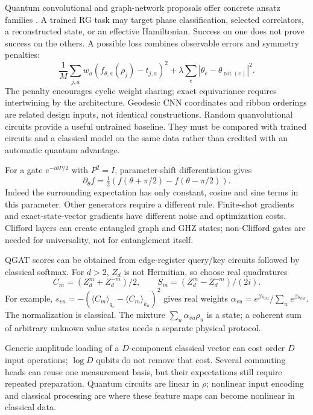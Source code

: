 \documentclass[11pt,oneside,openany]{book}
\theoremstyle{definition}\newtheorem{definition}[theorem]{Definition}
\theoremstyle{remark}\newtheorem{remark}[theorem]{Remark}
\begin{document}
Quantum convolutional and graph-network proposals offer concrete ansatz
families \cite{PhysCong,PhysZheng,PhysNing}. A trained RG task may target
phase classification, selected correlators, a reconstructed state, or an
effective Hamiltonian. Success on one does not prove success on the others.
A possible loss combines observable errors and symmetry penalties:
\[
 \frac1M\sum_{j,a}w_a(f_{\theta,a}(\rho_j)-t_{j,a})^2
 +\lambda\sum_e|\theta_e-\theta_{\operatorname{rot}(e)}|^2.
\]
The penalty encourages cyclic weight sharing; exact equivariance requires
intertwining by the architecture. Geodesic CNN coordinates and ribbon
orderings are related design inputs, not identical constructions.
Random quanvolutional circuits provide a useful untrained baseline. They
must be compared with trained circuits and a classical model on the same
data rather than credited with an automatic quantum advantage.

For a gate $e^{-i\theta P/2}$ with $P^2=I$, parameter-shift differentiation
gives
\[
 \partial_\theta f=\tfrac12(f(\theta+\pi/2)-f(\theta-\pi/2)).
\]
Indeed the surrounding expectation has only constant, cosine and sine
terms in this parameter. Other generators require a different rule.
Finite-shot gradients and exact-state-vector gradients have different
noise and optimization costs. Clifford layers can create entangled graph
and GHZ states; non-Clifford gates are needed for universality, not for
entanglement itself.

QGAT scores can be obtained from edge-register query/key circuits followed
by classical softmax. For $d>2$, $Z_d$ is not Hermitian, so choose real
quadratures
\[
 C_m=(Z_d^m+Z_d^{-m})/2,\qquad S_m=(Z_d^m-Z_d^{-m})/(2i).
\]
For example,
$s_{vu}=-(\langle C_m\rangle_{q_v}-\langle C_m\rangle_{k_u})^2$ gives
real weights $\alpha_{vu}=e^{\beta s_{vu}}/\sum_we^{\beta s_{vw}}$.
The normalization is classical. The mixture $\sum_u\alpha_{vu}\rho_u$
is a state; a coherent sum of arbitrary unknown value states needs a
separate physical protocol.

Generic amplitude loading of a $D$-component classical vector can cost
order $D$ input operations; $\log D$ qubits do not remove that cost.
Several commuting heads can reuse one measurement basis, but their
expectations still require repeated preparation. Quantum circuits are
linear in $\rho$; nonlinear input encoding and classical processing are
where these feature maps can become nonlinear in classical data.
\end{document}
